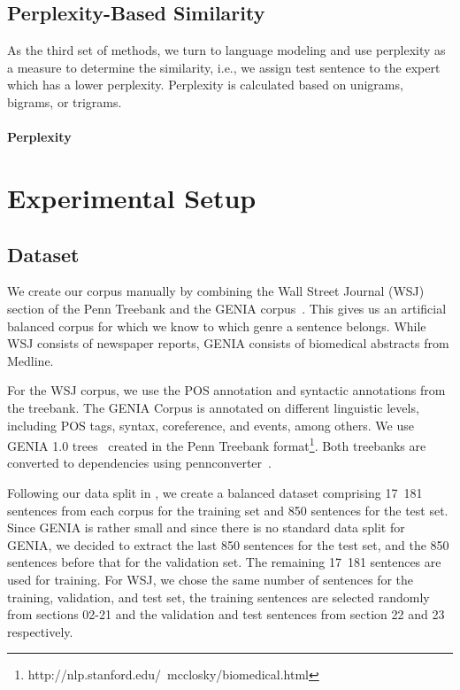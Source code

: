 \subsection{Perplexity-Based Similarity}

As the third set of methods, we turn to language modeling and use perplexity as a measure to determine the similarity, i.e., we assign test sentence to the expert which has a lower perplexity. Perplexity is calculated based on unigrams, bigrams, or trigrams.

\paragraph*{Perplexity}


\section{Experimental Setup} \label{exptsetup}

\subsection{Dataset}

We create our corpus manually by combining the Wall Street Journal (WSJ)~\cite{marcus:kim:ea:94} section of the Penn Treebank and the GENIA corpus~\cite{tateisi:tsujii:04}. This gives us an artificial balanced corpus for which we know to which genre a sentence belongs.  While WSJ consists of newspaper reports, GENIA consists of biomedical abstracts from Medline.


For the WSJ corpus, we use the POS annotation and syntactic annotations  from the treebank. The GENIA Corpus is annotated on different linguistic levels, including POS tags, syntax, coreference, and events, among others. We use GENIA 1.0 trees~\cite{Ohta:2002:GCA:1289189.1289260} created in the Penn Treebank format\footnote{http://nlp.stanford.edu/~mcclosky/biomedical.html}. Both treebanks are converted to dependencies using pennconverter~\cite{johansson2007a}.

Following our data split in , we create a balanced dataset comprising 17~181 sentences from each corpus for the training set and 850 sentences for the test set. Since GENIA is rather small and since there is no standard data split for GENIA, we decided to extract the last 850 sentences for the test set, and the 850 sentences before that for the validation set. The remaining 17~181 sentences are used for training. For WSJ, we chose the same number of sentences for the training, validation,  and test set, the training sentences are selected randomly from sections 02-21 and the validation and test sentences from section 22 and 23 respectively.


